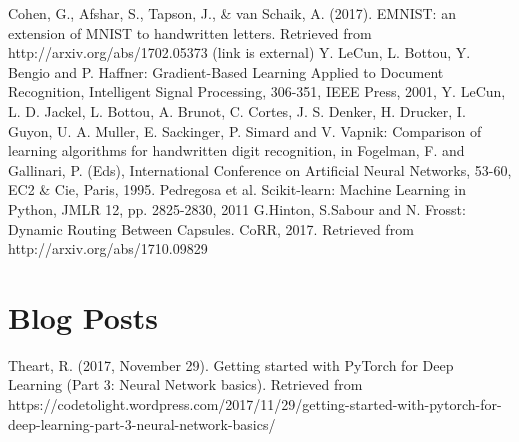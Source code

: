 \documentclass[letterpaper, 10 pt, conference]{ieeeconf}  %
\begin{document}
\newpage
\begin{thebibliography}{99}
 Cohen, G., Afshar, S., Tapson, J., \& van Schaik, A. (2017). EMNIST: an extension of MNIST to handwritten letters. Retrieved from http://arxiv.org/abs/1702.05373 (link is external)
 Y. LeCun, L. Bottou, Y. Bengio and P. Haffner: Gradient-Based Learning Applied to Document Recognition, Intelligent Signal Processing, 306-351, IEEE Press, 2001,
 Y. LeCun, L. D. Jackel, L. Bottou, A. Brunot, C. Cortes, J. S. Denker, H. Drucker, I. Guyon, U. A. Muller, E. Sackinger, P. Simard and V. Vapnik: Comparison of learning algorithms for handwritten digit recognition, in Fogelman, F. and Gallinari, P. (Eds), International Conference on Artificial Neural Networks, 53-60, EC2 \& Cie, Paris, 1995.
 Pedregosa et al. Scikit-learn: Machine Learning in Python, JMLR 12, pp. 2825-2830, 2011
 G.Hinton, S.Sabour and N. Frosst: Dynamic Routing Between Capsules. CoRR, 2017. Retrieved from http://arxiv.org/abs/1710.09829
\section*{Blog Posts}

 Theart, R. (2017, November 29). Getting started with PyTorch for Deep Learning (Part 3: Neural Network basics). Retrieved from https://codetolight.wordpress.com/2017/11/29/getting-started-with-pytorch-for-deep-learning-part-3-neural-network-basics/


\end{thebibliography}

\newpage
\end{document}
